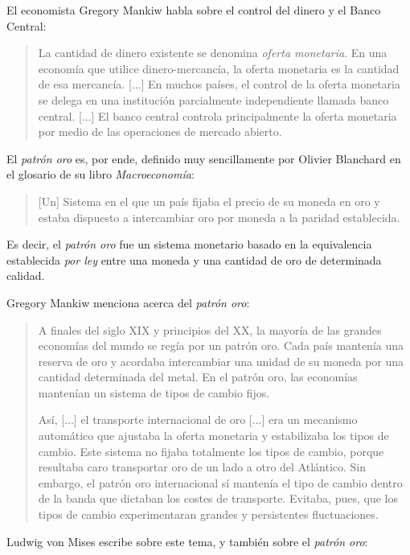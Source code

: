 \documentclass[12pt,a4paper,twoside]{book}
\begin{document}
El economista Gregory Mankiw habla sobre el control del dinero y el Banco Central:

\begin{quotation}
La cantidad de dinero existente se denomina \textit{oferta monetaria}. En una economía que utilice dinero-mercancía, la oferta monetaria es la cantidad de esa mercancía. [...] En muchos países, el control de la oferta monetaria se delega en una institución parcialmente independiente llamada banco central. [...] El banco central controla principalmente la oferta monetaria por medio de las operaciones de mercado abierto. \cite[pág. 152]{mankiw}
\end{quotation}

El \textit{patrón oro} es, por ende, definido muy sencillamente por Olivier Blanchard en el glosario de su libro \textit{Macroeconomía}:

\begin{quote}
[Un] Sistema en el que un país fijaba el precio de su moneda en oro y estaba dispuesto a intercambiar oro por moneda a la paridad establecida. \cite[pág. 628]{blanchard}
\end{quote}

Es decir, el \textit{patrón oro} fue un sistema monetario basado en la equivalencia establecida \textit{por ley} entre una moneda y una cantidad de oro de determinada calidad.

Gregory Mankiw menciona acerca del \textit{patrón oro}:

\begin{quotation}
A finales del siglo XIX y principios del XX, la mayoría de las grandes economías del mundo se regía por un patrón oro. Cada país mantenía una reserva de oro y acordaba intercambiar una unidad de su moneda por una cantidad determinada del metal. En el patrón oro, las economías mantenían un sistema de tipos de cambio fijos.

Así, [...] el transporte internacional de oro [...] era un mecanismo automático que ajustaba la oferta monetaria y estabilizaba los tipos de cambio. Este sistema no fijaba totalmente los tipos de cambio, porque resultaba caro transportar oro de un lado a otro del Atlántico. Sin embargo, el patrón oro internacional sí mantenía el tipo de cambio dentro de la banda que dictaban los costes de transporte. Evitaba, pues, que los tipos de cambio experimentaran grandes y persistentes fluctuaciones. \cite[págs. 517-518]{mankiw}
\end{quotation}

Ludwig von Mises escribe sobre este tema, y también sobre el \textit{patrón oro}:
\end{document}
